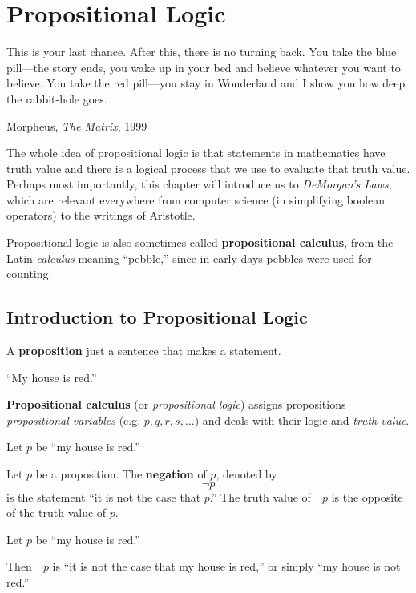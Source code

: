 \chapter{Propositional Logic}
\epigraph{This is your last chance. After this, there is no turning back. You
take the blue pill---the story ends, you wake up in your bed and believe
whatever you want to believe. You take the red pill---you stay in Wonderland and
I show you how deep the rabbit-hole goes.}{Morpheus, \emph{The Matrix}, 1999}
\label{ch:propositional}

The whole idea of propositional logic is that statements in mathematics have truth value and there is a logical process that we use to evaluate that truth value.
Perhaps most importantly, this chapter will introduce us to \emph{DeMorgan's Laws}, which are relevant everywhere from computer science (in simplifying boolean operators) to the writings of Aristotle.

Propositional logic is also sometimes called \textbf{propositional calculus},
from the Latin \emph{calculus} meaning ``pebble,'' since in early days pebbles
were used for counting.

\section{Introduction to Propositional Logic}
\label{sec:propintro}

A \textbf{proposition} just a sentence that makes a statement.
\begin{ex}
  ``My house is red.''
\end{ex}

  \textbf{Propositional calculus} (or \emph{propositional logic}) assigns propositions \emph{propositional variables}
  (e.g. \(p, q, r, s, \ldots\)) and deals with their logic and \emph{truth value}.
  \begin{ex}
    Let $p$ be ``my house is red.''
  \end{ex}

  Let \(p\) be a proposition. The \textbf{negation} of \(p\), denoted by \[\neg p\] is the statement
  ``it is not the case that \(p\).''
  The truth value of \(\neg p\) is the opposite of the truth value of \(p\).
  \begin{ex}
    Let $p$ be ``my house is red.''

    Then $\neg p$ is ``it is not the case that my house is red,'' or simply ``my house is not red.''
  \end{ex}

